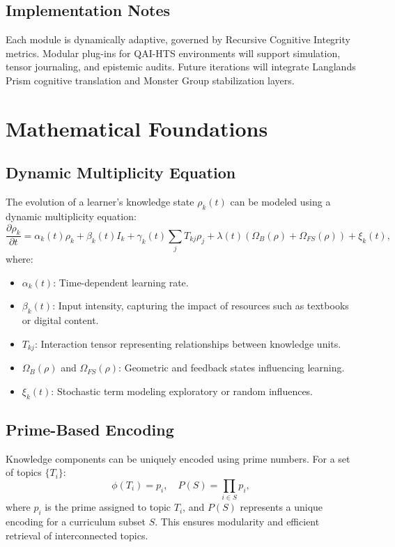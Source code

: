 \documentclass{article}
\theoremstyle{plain}
\theoremstyle{claimstyle}
\begin{document}
\subsection*{Implementation Notes}
Each module is dynamically adaptive, governed by Recursive Cognitive Integrity metrics. Modular plug-ins for QAI-HTS environments will support simulation, tensor journaling, and epistemic audits. Future iterations will integrate Langlands Prism cognitive translation and Monster Group stabilization layers.
\section{Mathematical Foundations}

\subsection{Dynamic Multiplicity Equation}
The evolution of a learner's knowledge state \( \rho_k(t) \) can be modeled using a dynamic multiplicity equation:
\begin{equation}
\frac{\partial \rho_k}{\partial t} = \alpha_k(t) \rho_k + \beta_k(t) I_k + \gamma_k(t) \sum_j T_{kj} \rho_j + \lambda(t)(\Omega_B(\rho) + \Omega_{FS}(\rho)) + \xi_k(t),
\label{eq:dynamic}
\end{equation}
where:
\begin{itemize}
    \item \( \alpha_k(t) \): Time-dependent learning rate.
    \item \( \beta_k(t) \): Input intensity, capturing the impact of resources such as textbooks or digital content.
    \item \( T_{kj} \): Interaction tensor representing relationships between knowledge units.
    \item \( \Omega_B(\rho) \) and \( \Omega_{FS}(\rho) \): Geometric and feedback states influencing learning.
    \item \( \xi_k(t) \): Stochastic term modeling exploratory or random influences.
\end{itemize}

\subsection{Prime-Based Encoding}
Knowledge components can be uniquely encoded using prime numbers. For a set of topics \( \{T_i\} \):
\begin{equation}
\phi(T_i) = p_i, \quad P(S) = \prod_{i \in S} p_i,
\label{eq:prime_encoding}
\end{equation}
where \( p_i \) is the prime assigned to topic \( T_i \), and \( P(S) \) represents a unique encoding for a curriculum subset \( S \). This ensures modularity and efficient retrieval of interconnected topics.
\end{document}

